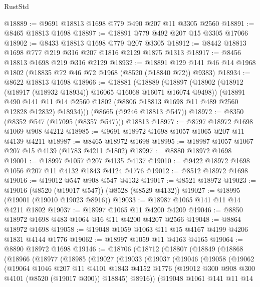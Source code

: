 \begin{lexlean}{RustStd}
\begin{coremodule}
@18889 := @9691 @18813 @1698 @779 @490 @207 @11 @3305 @2560
@18891 := @8465 @18813 @1698
@18897 := @18891 @779 @492 @207 @15 @3305 @17066
@18902 := @8433 @18813 @1698 @779 @207 @3305
@18912 := @8442 @18813 @1698 @777 @219 @316 @207 @1816 @2129 @1875 @1313
@18917 := @8456 @18813 @1698 @219 @316 @2129
@18932 := @18891 @129 @141 @46 @14 @1968 @1802 (@18835 @72 @46 @72 @1968 (@8520 (@18840 @72)) @9383)
@18934 := @8622 @18813 @1698
@18966 := @18881
    (@18889
      (@18897
        (@18902 (@18912 (@18917 (@18932 @18934)) @16065 @16068 @16071 @16074 @9498))
        (@18891
          @490
          @141
          @11
          @14
          @2560
          @1802
          (@8806 @18813 @1698 @11 @489 @2560 @12828 @12832)
          @18934)))
    (@8665 (@9246 @18813 @547))
@18972 := @8350 (@8352 @547 (@17095 (@8357 @547))) @18813
@18977 := @8797 @18972 @1698 @1069 @908 @4212
@18985 := @9691 @18972 @1698 @1057 @1065 @207 @11 @4139 @4211
@18987 := @8465 @18972 @1698
@18995 := @18987 @1057 @1067 @207 @15 @4139 (@1783 @4211 @1802)
@18997 := @8880 @18972 @1698
@19001 := @18997 @1057 @207 @4135 @4137
@19010 := @9422 @18972 @1698 @1056 @207 @11 @4132 @1843 @4124 @1776
@19012 := @8512 @18972 @1698
@19016 := @19012 @547 @908 @547 @4132
@19017 := @8521 @18972
@19023 := @19016 (@8520 (@19017 @547)) (@8528 (@8529 @4132))
@19027 := @18995 (@19001 (@19010 @19023 @8916))
@19033 := @18987 @1065 @141 @11 @14 @4211 @1802
@19037 := @18997 @1065 @11 @4200 @4209
@19046 := @8850 @18972 @1698 @483 @1064 @16 @11 @4200 @4207 @2566
@19048 := @8864 @18972 @1698
@19058 := @19048 @1059 @1063 @11 @15 @4167 @4199 @4206 @1831 @4144 @1776
@19062 := @18997 @1059 @11 @4163 @4165
@19064 := @8890 @18972 @1698
@19146 := @18706
    (@18712
      (@18807
        (@18849
          (@18868
            (@18966
              (@18977
                (@18985
                  (@19027
                    (@19033
                      (@19037
                        (@19046
                          (@19058
                            (@19062
                              (@19064
                                @1046
                                @207
                                @11
                                @4101
                                @1843
                                @4152
                                @1776
                                (@19012 @300 @908 @300 @4101 (@8520 (@19017 @300)) @18845)
                                @8916))
                            (@19048
                              @1061
                              @141
                              @11
                              @14

\end{coremodule}
\end{lexlean}
